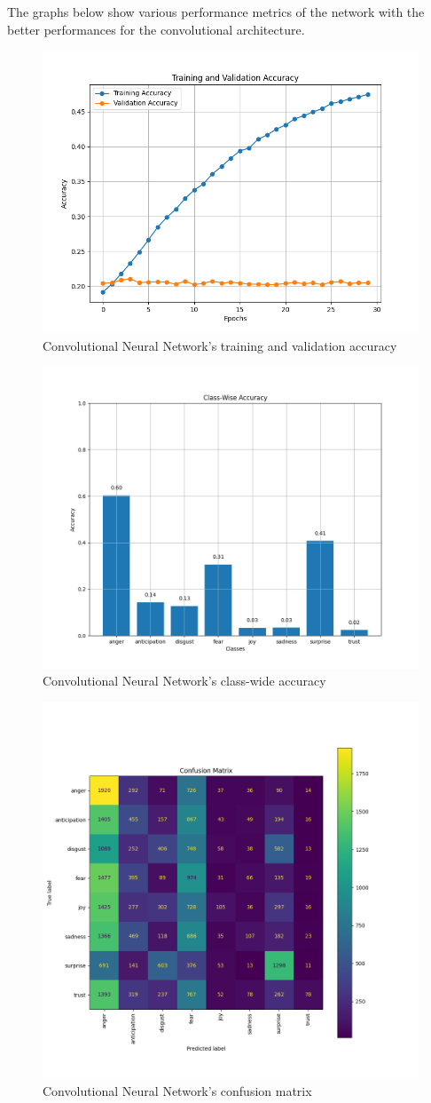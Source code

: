The graphs below show various performance metrics of the network with the better
performances for the convolutional architecture.
\begin{figure}[H]
    \centering
    \includegraphics[width=0.6\linewidth]{pictures/cnn_accuracy.png}
    \caption{Convolutional Neural Network's training and validation accuracy}
    \label{fig:cnn_train_val_acc}
\end{figure}

\begin{figure}[H]
    \centering
    \includegraphics[width=0.6\linewidth]{pictures/cnn_class_accuracy.png}
    \caption{Convolutional Neural Network's class-wide accuracy}
    \label{fig:cnn_classacc}
\end{figure}

\begin{figure}[H]
    \centering
    \includegraphics[width=0.6\linewidth]{pictures/cnn_confusion_matrix.png}
    \caption{Convolutional Neural Network's confusion matrix}
    \label{fig:cnn_confmatr}
\end{figure}

